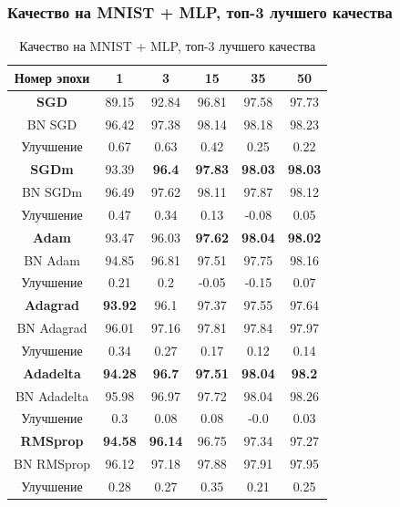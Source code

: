 \documentclass{beamer}
\begin{document}
\begin{frame}
	\frametitle{\footnotesize Качество на MNIST + MLP, топ-3 лучшего качества}
\begin{table}
\centering
\scriptsize
\begin{tabular}{|c|c|c|c|c|c|}\hline
Номер эпохи & 1 & 3 & 15 & 35 & 50 \\\hline\hline
\textbf{SGD} & 89.15 & 92.84 & 96.81 & 97.58 & 97.73 \\\hline
BN SGD & 96.42 & 97.38 & 98.14 & 98.18 & 98.23 \\\hline
{Улучшение} & 0.67 & 0.63 & 0.42 & 0.25 & 0.22 \\\hline\hline
\color{red}\textbf{SGDm} & 93.39 & \color{green} \textbf{96.4} & \color{green}\textbf{97.83} & \color{green}\textbf{98.03} & \color{green}\textbf{98.03} \\\hline
BN SGDm & 96.49 & 97.62 & 98.11 & 97.87 & 98.12 \\\hline
{Улучшение} & 0.47 & 0.34 & 0.13 & -0.08 & 0.05 \\\hline\hline
\color{red}\textbf{Adam} & 93.47 & 96.03 & \color{green}\textbf{97.62} & \color{green}\textbf{98.04} & \color{green}\textbf{98.02} \\\hline
BN Adam & 94.85 & 96.81 & 97.51 & 97.75 & 98.16 \\\hline
{Улучшение} & 0.21 & 0.2 & -0.05 & -0.15 & 0.07 \\\hline\hline
\textbf{Adagrad} & \color{green}\textbf{93.92} & 96.1 & 97.37 & 97.55 & 97.64 \\\hline
BN Adagrad & 96.01 & 97.16 & 97.81 & 97.84 & 97.97 \\\hline
{Улучшение} & 0.34 & 0.27 & 0.17 & 0.12 & 0.14 \\\hline\hline
\color{red}\textbf{Adadelta} & \color{green}\textbf{94.28} & \color{green}\textbf{96.7} & \color{green}\textbf{97.51} & \color{green}\textbf{98.04} & \color{green}\textbf{98.2} \\\hline
BN Adadelta & 95.98 & 96.97 & 97.72 & 98.04 & 98.26 \\\hline
{Улучшение} & 0.3 & 0.08 & 0.08 & -0.0 & 0.03 \\\hline\hline
\textbf{RMSprop} & \color{green}\textbf{94.58} & \color{green}\textbf{96.14} & 96.75 & 97.34 & 97.27 \\\hline
BN RMSprop & 96.12 & 97.18 & 97.88 & 97.91 & 97.95 \\\hline
{Улучшение} & 0.28 & 0.27 & 0.35 & 0.21 & 0.25 \\\hline
\end{tabular}
\caption{\scriptsize Качество на MNIST + MLP, топ-3 лучшего качества}
\end{table}
\end{frame}
\end{document}
